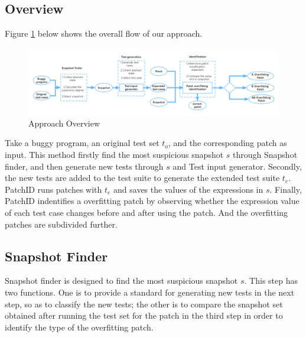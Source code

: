 \subsection{Overview}\label{4.1}
Figure \ref{fig5} below shows the overall flow of our approach.

\begin{figure}[ht]%
	\centering
	\includegraphics[width=1\textwidth]{fig5.png}
	\caption{Approach Overview}\label{fig5}
\end{figure}

Take a buggy program, an original test set $t_o$, and the corresponding patch as input. This method firstly find the most suspicious snapshot $s$ through Snapshot finder, and then generate new tests through $s$ and Test input generator. Secondly, the new tests are added to the test suite to generate the extended test suite $t_e$. PatchID runs patches with $t_e$ and saves the values of the expressions in $s$. Finally, PatchID indentifies a overfitting patch by observing whether the expression value of each test case changes before and after using the patch. And the overfitting patches are subdivided further.

\subsection{Snapshot Finder}\label{4.2}
Snapshot finder is designed to find the most suspicious snapshot $s$. This step has two functions. One is to provide a standard for generating new tests in the next step, so as to classify the new tests; the other is to compare the snapshot set obtained after running the test set for the patch in the third step in order to identify the type of the overfitting patch.

